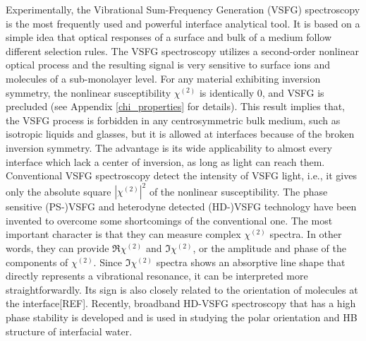 Experimentally, the Vibrational Sum-Frequency Generation (VSFG) spectroscopy is the most frequently used and powerful interface analytical tool\cite{Shen2016,Morita2018,Shen2020}.
It is based on a simple idea that optical responses of a surface and bulk of a medium follow different selection rules.
The VSFG spectroscopy utilizes a second-order nonlinear optical process and the resulting signal is very sensitive to surface ions and 
molecules of a sub-monolayer level\cite{Morita2008,WangHongFei2015,WenYuChieh2016,Ishiyama2017,Penalber-Johnstone2018}. 
%
For any material exhibiting inversion symmetry, the nonlinear susceptibility $\chi^{(2)}$ is identically 0, and VSFG is precluded\cite{Franken1963} (see Appendix \ref{chi_properties} for details).
This result implies that, the VSFG process is forbidden in any centrosymmetric bulk medium\cite{Che2012},
such as isotropic liquids and glasses, but it is allowed at interfaces because of the broken inversion symmetry\cite{PF00}.
The advantage is its wide applicability to almost every interface which lack a center of inversion, as long as light can reach them. 
%
Conventional VSFG spectroscopy detect the intensity of VSFG light,
i.e., it gives only the absolute square $|\chi^{(2)}|^2$ of the nonlinear susceptibility\cite{Shen84,Guyot-Sionnest1986,Shen2020}. 
The phase sensitive (PS-)VSFG\cite{Ji2008} and heterodyne detected (HD-)VSFG technology have been invented to overcome some shortcomings of the conventional one. 
The most important character is that they can measure complex $\chi^{(2)}$ spectra. 
In other words, they can provide $\Re \chi^{(2)}$ and $\Im \chi^{(2)}$, or the amplitude and phase of the components of $\chi^{(2)}$. 
Since $\Im \chi^{(2)}$ spectra shows an absorptive line shape that directly represents a vibrational resonance, 
it can be interpreted more straightforwardly\cite{Nihonyanagi2013}.
Its sign is also closely related to the orientation of molecules at the interface[REF].
Recently, broadband HD-VSFG spectroscopy that has a high phase stability is developed and is used in studying the polar orientation and HB structure of interfacial
water\cite{Nihonyanagi2009,Shen2013}. 

